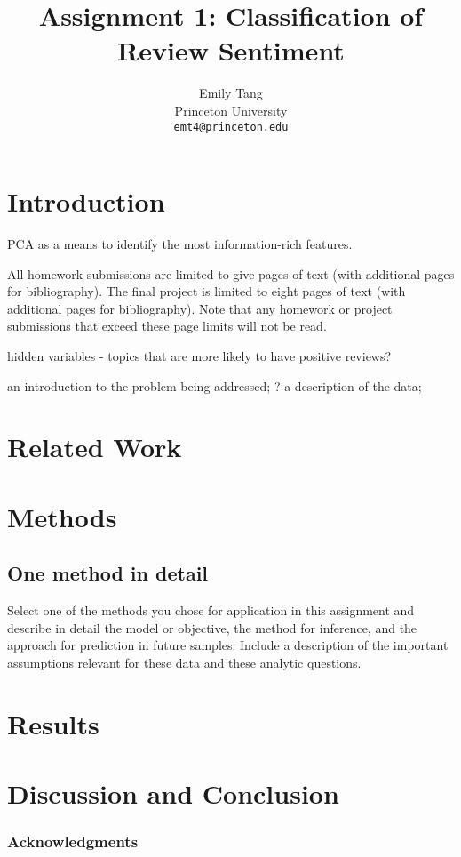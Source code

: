 \documentclass{article} %
\title{Assignment 1: Classification of Review Sentiment}
\author{
Emily Tang\\
Princeton University\\
\texttt{emt4@princeton.edu} \\
}
\begin{document}
\maketitle

\begin{abstract}

\end{abstract}

\section{Introduction}

PCA as a means to identify the most information-rich features.

All homework submissions are limited to give pages of text (with additional pages for bibliography). The final project is limited to eight pages of text (with additional pages for bibliography). Note that any homework or project submissions that exceed these page limits will not be read.



hidden variables - topics that are more likely to have positive reviews? 

 an introduction to the problem being addressed;
? a description of the data;

\section{Related Work}

\section{Methods}

\subsection{One method in detail}

Select one of the methods you chose for application in this assignment and describe in detail the model or objective, the method for inference, and the approach for prediction in future samples. Include a description of the important assumptions relevant for these data and these analytic questions.

\section{Results}

\section{Discussion and Conclusion}

\subsubsection*{Acknowledgments}




\end{document}
